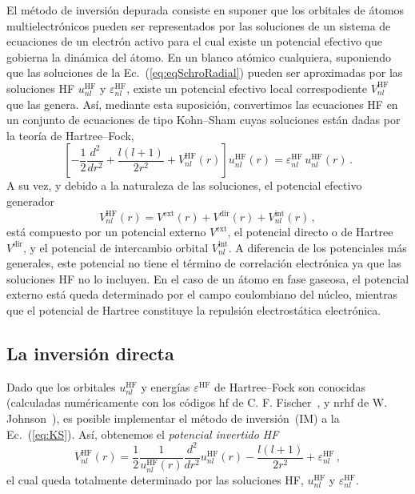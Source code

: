 El método de inversión depurada consiste en suponer que los orbitales
de átomos multielectrónicos pueden ser representados por las soluciones
de un sistema de ecuaciones de un electrón activo para el cual existe 
un potencial efectivo que gobierna la dinámica del átomo. 
En un blanco atómico cualquiera, suponiendo que las soluciones de la 
Ec.~(\ref{eq:eqSchroRadial}) pueden ser aproximadas por las soluciones 
HF $u_{nl}^{\mathrm{HF}}$ y $\varepsilon_{nl}^{\mathrm{HF}}$, existe un 
potencial efectivo local correspodiente $V_{nl}^{\mathrm{HF}}$ que las 
genera. Así, mediante esta suposición, convertimos las ecuaciones HF en 
un conjunto de ecuaciones de tipo Kohn--Sham cuyas soluciones están 
dadas por la teoría de Hartree--Fock,
\begin{equation}
\left[ 
-\frac{1}{2}\frac{d^{2}}{dr^{2}} + \frac{l(l+1)}{2r^{2}} + 
V_{nl}^{\mathrm{HF}}(r) 
\right] u_{nl}^{\mathrm{HF}}(r)
   = \varepsilon_{nl}^{\mathrm{HF}}\, u_{nl}^{\mathrm{HF}}(r) \, .
\label{eq:KS}
\end{equation}
A su vez, y debido a la naturaleza de las soluciones, el potencial 
efectivo generador
\begin{equation}
V_{nl}^{\mathrm{HF}}(r) = V^{\mathrm{ext}}(r) + 
V^{\mathrm{dir}}(r) + V_{nl}^{\mathrm{int}}(r) \, ,  
\label{eq:veff}
\end{equation}
está compuesto por un potencial externo $V^{\mathrm{ext}}$, 
el potencial directo o de Hartree $V^{\mathrm{dir}}$, y el potencial
de intercambio orbital $V_{nl}^{\mathrm{int}}$. A diferencia de los
potenciales más generales, este potencial no tiene el término de 
correlación electrónica ya que las soluciones HF no lo incluyen. En el 
caso de un átomo en fase gaseosa, el potencial externo está queda 
determinado por el campo coulombiano del núcleo, mientras que el 
potencial de Hartree constituye la repulsión electrostática electrónica. 


\subsection{La inversión directa}
\label{subsec:inversion}

Dado que los orbitales $u_{nl}^{\mathrm{HF}}$ y energías  
$\varepsilon^{\mathrm{HF}}$ de Hartree--Fock son conocidas (calculadas 
numéricamente con los códigos {\sc hf} de C. F. Fischer~\cite{FroeseFischer:97}, 
y {\sc nrhf} de W. Johnson~\cite{Johnson:07}), es posible implementar 
el método de inversión~(\acs{IM}) a la Ec.~(\ref{eq:KS}). Así, obtenemos 
el \textit{potencial invertido HF} 
\begin{equation}
V_{nl}^{\mathrm{HF}}(r) = 
\frac{1}{2}\frac{1}{u_{nl}^{\mathrm{HF}}(r)}
\frac{d^2}{dr^{2}}u_{nl}^{\mathrm{HF}}(r) - 
\frac{l(l+1)}{2r^{2}}+\varepsilon _{nl}^{\mathrm{HF}} \,,
\label{eq:VHF}
\end{equation}
el cual queda totalmente determinado por las soluciones HF,
$u_{nl}^{\mathrm{HF}}$ y $\varepsilon_{nl}^{\mathrm{HF}}$.

